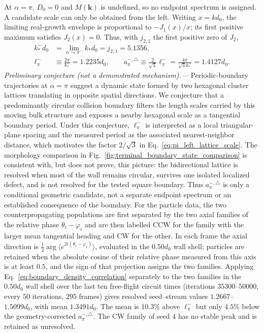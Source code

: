 \documentclass[11pt]{article}
\numberwithin{equation}{section}
\begin{document}
At $\alpha=\pi$, $D_0=0$ and $M(\mathbf k)$ is undefined, so no endpoint
spectrum is assigned.  A candidate scale can only be obtained from the left.
Writing $x=kd_0$, the limiting real-growth envelope is proportional to
$-J_1(x)/x$; its first positive maximum satisfies $J_2(x)=0$.  Thus, with $j_{2,1}$
the first positive zero of $J_2$,
\begin{equation}
  \begin{aligned}
  k_\ast^-d_0
  &=\lim_{\alpha\to\pi^-}k_\ast d_0=j_{2,1}=5.1356,\\
  \ell_\pi^-&\equiv\frac{2\pi}{k_\ast^-}=1.2235d_0,
  \qquad
  a_{\pi}^{-,\triangle}\equiv\frac{2}{\sqrt{3}}\ell_\pi^-
  =\frac{4\pi}{\sqrt{3}k_\ast^-}=1.4127d_0 .
  \end{aligned}
  \label{eq:pi_left_lattice_scale}
\end{equation}
\emph{Preliminary conjecture (not a demonstrated mechanism).---}
Periodic-boundary trajectories at $\alpha=\pi$ suggest a dynamic state formed
by two hexagonal cluster lattices translating in opposite spatial directions.
We conjecture that a predominantly circular collision boundary filters the
length scales carried by this moving bulk structure and exposes a nearby
hexagonal scale as a tangential boundary period.  Under this conjecture,
$\ell_\pi^-$ is interpreted as a local triangular-plane spacing and the
measured period as the associated nearest-neighbor distance, which motivates
the factor $2/\sqrt{3}$ in Eq.~\eqref{eq:pi_left_lattice_scale}.  The morphology
comparison in Fig.~\ref{fig:terminal_boundary_state_comparison} is consistent
with, but does not prove, this picture: the bidirectional lattice is resolved
when most of the wall remains circular, survives one isolated localized
defect, and is not resolved for the tested square boundary.  Thus
$a_{\pi}^{-,\triangle}$ is only a conditional geometric candidate, not a
separate endpoint spectrum or an established consequence of the boundary.
For the particle data, the two counterpropagating populations are first
separated by the two axial families of the relative phase
$\theta_i-\varphi_i$ and are then labelled CCW for the family with the larger
mean tangential heading and CW for the other. In each frame the axial direction is
$\frac12\arg\langle e^{2i(\theta_i-\varphi_i)}\rangle$, evaluated in the
$0.50d_0$ wall shell; particles are retained when the absolute cosine of
their relative phase measured from this axis is at least $0.5$, and the
sign of that projection assigns the two families.
Applying Eq.~\eqref{eq:boundary_density_correlation}
separately to the two families in the $0.50d_0$ wall shell over the last ten
free-flight circuit times (iterations $35300$--$50000$, every $50$ iterations,
$295$ frames) gives resolved seed--stream values
$1.2667$--$1.5099d_0$, with mean $1.3491d_0$.  The mean is $10.3\%$ above
$\ell_\pi^-$ but only $4.5\%$ below the geometry-corrected
$a_{\pi}^{-,\triangle}$.  The CW family of seed $4$ has no stable peak and is
retained as unresolved.
\end{document}
